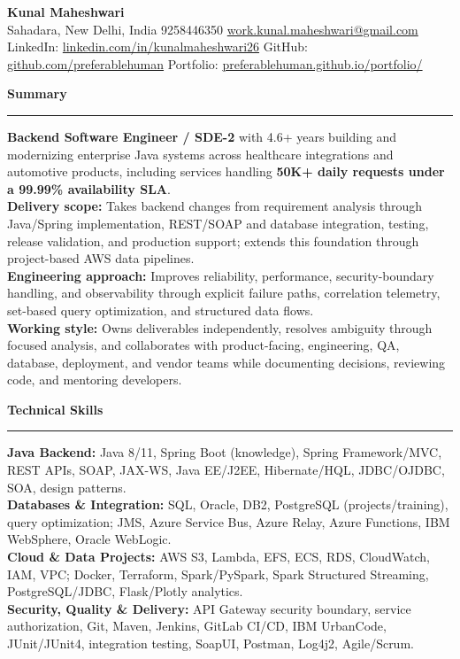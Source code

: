\documentclass[11pt,letterpaper]{article}
\newcommand{\ressection}[1]{\Needspace{6\baselineskip}\vspace{8pt}\par\textbf{#1}\par\vspace{2pt}\hrule\vspace{5pt}}
\begin{document}
\pagestyle{empty}\raggedright\fontsize{11}{12.5}\selectfont

{\Large \textbf{Kunal Maheshwari}}\\
Sahadara, New Delhi, India \textbar{} 9258446350 \textbar{} \href{mailto:work.kunal.maheshwari@gmail.com}{work.kunal.maheshwari@gmail.com}\\
LinkedIn: \href{https://www.linkedin.com/in/kunalmaheshwari26}{linkedin.com/in/kunalmaheshwari26} \textbar{} GitHub: \href{https://github.com/preferablehuman}{github.com/preferablehuman} \textbar{} Portfolio: \href{https://preferablehuman.github.io/portfolio/}{preferablehuman.github.io/portfolio/}

\ressection{Summary}
\textbf{Backend Software Engineer / SDE-2} with 4.6+ years building and modernizing enterprise Java systems across healthcare integrations and automotive products, including services handling \textbf{50K+ daily requests under a 99.99\% availability SLA}.\\[2pt]
\textbf{Delivery scope:} Takes backend changes from requirement analysis through Java/Spring implementation, REST/SOAP and database integration, testing, release validation, and production support; extends this foundation through project-based AWS data pipelines.\\[2pt]
\textbf{Engineering approach:} Improves reliability, performance, security-boundary handling, and observability through explicit failure paths, correlation telemetry, set-based query optimization, and structured data flows.\\[2pt]
\textbf{Working style:} Owns deliverables independently, resolves ambiguity through focused analysis, and collaborates with product-facing, engineering, QA, database, deployment, and vendor teams while documenting decisions, reviewing code, and mentoring developers.

\ressection{Technical Skills}
\textbf{Java Backend:} Java 8/11, Spring Boot (knowledge), Spring Framework/MVC, REST APIs, SOAP, JAX-WS, Java EE/J2EE, Hibernate/HQL, JDBC/OJDBC, SOA, design patterns.\\
\textbf{Databases \& Integration:} SQL, Oracle, DB2, PostgreSQL (projects/training), query optimization; JMS, Azure Service Bus, Azure Relay, Azure Functions, IBM WebSphere, Oracle WebLogic.\\
\textbf{Cloud \& Data Projects:} AWS S3, Lambda, EFS, ECS, RDS, CloudWatch, IAM, VPC; Docker, Terraform, Spark/PySpark, Spark Structured Streaming, PostgreSQL/JDBC, Flask/Plotly analytics.\\
\textbf{Security, Quality \& Delivery:} API Gateway security boundary, service authorization, Git, Maven, Jenkins, GitLab CI/CD, IBM UrbanCode, JUnit/JUnit4, integration testing, SoapUI, Postman, Log4j2, Agile/Scrum.
\end{document}
